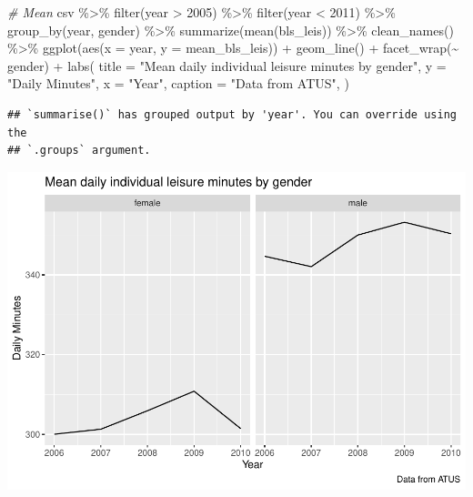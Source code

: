 \documentclass[
]{article}
\newenvironment{Shaded}{\begin{snugshade}}{\end{snugshade}}
\newcommand{\AttributeTok}[1]{\textcolor[rgb]{0.77,0.63,0.00}{#1}}
\newcommand{\CommentTok}[1]{\textcolor[rgb]{0.56,0.35,0.01}{\textit{#1}}}
\newcommand{\DecValTok}[1]{\textcolor[rgb]{0.00,0.00,0.81}{#1}}
\newcommand{\FunctionTok}[1]{\textcolor[rgb]{0.00,0.00,0.00}{#1}}
\newcommand{\NormalTok}[1]{#1}
\newcommand{\SpecialCharTok}[1]{\textcolor[rgb]{0.00,0.00,0.00}{#1}}
\newcommand{\StringTok}[1]{\textcolor[rgb]{0.31,0.60,0.02}{#1}}
\begin{document}
\begin{Shaded}
\begin{Highlighting}[]
\CommentTok{\# Mean}
\NormalTok{csv }\SpecialCharTok{\%\textgreater{}\%}
  \FunctionTok{filter}\NormalTok{(year }\SpecialCharTok{\textgreater{}} \DecValTok{2005}\NormalTok{) }\SpecialCharTok{\%\textgreater{}\%}
  \FunctionTok{filter}\NormalTok{(year }\SpecialCharTok{\textless{}} \DecValTok{2011}\NormalTok{) }\SpecialCharTok{\%\textgreater{}\%}
  \FunctionTok{group\_by}\NormalTok{(year, gender) }\SpecialCharTok{\%\textgreater{}\%}
  \FunctionTok{summarize}\NormalTok{(}\FunctionTok{mean}\NormalTok{(bls\_leis)) }\SpecialCharTok{\%\textgreater{}\%}
  \FunctionTok{clean\_names}\NormalTok{() }\SpecialCharTok{\%\textgreater{}\%}
  \FunctionTok{ggplot}\NormalTok{(}\FunctionTok{aes}\NormalTok{(}\AttributeTok{x =}\NormalTok{ year, }\AttributeTok{y =}\NormalTok{ mean\_bls\_leis)) }\SpecialCharTok{+}
  \FunctionTok{geom\_line}\NormalTok{() }\SpecialCharTok{+}
  \FunctionTok{facet\_wrap}\NormalTok{(}\SpecialCharTok{\textasciitilde{}}\NormalTok{ gender) }\SpecialCharTok{+}
  \FunctionTok{labs}\NormalTok{(}
  \AttributeTok{title =} \StringTok{"Mean daily individual leisure minutes by gender"}\NormalTok{,}
  \AttributeTok{y =} \StringTok{"Daily Minutes"}\NormalTok{,}
  \AttributeTok{x =} \StringTok{"Year"}\NormalTok{,}
  \AttributeTok{caption =} \StringTok{"Data from ATUS"}\NormalTok{,}
\NormalTok{) }
\end{Highlighting}
\end{Shaded}

\begin{verbatim}
## `summarise()` has grouped output by 'year'. You can override using the
## `.groups` argument.
\end{verbatim}

\includegraphics{Paper2_files/figure-latex/graphs-7.pdf}
\end{document}
